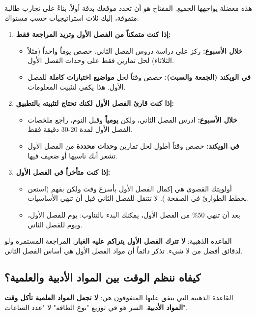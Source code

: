 \documentclass[12pt,a4paper]{book}
\begin{document}
	هذه معضلة يواجهها الجميع. المفتاح هو أن تحدد موقعك بدقة أولاً. بناءً على تجارب طالبة متفوقة، إليك ثلاث استراتيجيات حسب مستواك:
	
	\begin{enumerate}
		\item \textbf{إذا كنت متمكناً من الفصل الأول وتريد المراجعة فقط:}
		\begin{itemize}
			\item \textbf{خلال الأسبوع:} ركز على دراسة دروس الفصل الثاني. خصص يوماً واحداً (مثلاً الثلاثاء) لحل تمارين فقط على وحدات الفصل الأول.
			\item \textbf{في الويكند (الجمعة والسبت):} خصص وقتاً لحل \textbf{مواضيع اختبارات كاملة} للفصل الأول. هذا يكفي لتثبيت المعلومات.
		\end{itemize}
		\item \textbf{إذا كنت قارئ الفصل الأول لكنك تحتاج لتثبيته بالتطبيق:}
		\begin{itemize}
			\item \textbf{خلال الأسبوع:} ادرس الفصل الثاني، ولكن \textbf{يومياً} وقبل النوم، راجع ملخصات الفصل الأول لمدة 20-30 دقيقة فقط.
			\item \textbf{في الويكند:} خصص وقتاً أطول لحل تمارين \textbf{وحدات محددة} من الفصل الأول تشعر أنك ناسيها أو ضعيف فيها.
		\end{itemize}
		\item \textbf{إذا كنت متأخراً في الفصل الأول:}
		\begin{itemize}
			\item أولويتك القصوى هي إكمال الفصل الأول بأسرع وقت ولكن بفهم (استعن بخطط الطوارئ في الصفحة \pageref{sec:psy-late-start-success}). لا تنتقل للفصل الثاني قبل أن تنهي الأساسيات. 
			\item بعد أن تنهي 50\% من الفصل الأول، يمكنك البدء بالتناوب: يوم للفصل الأول، ويوم للفصل الثاني.
		\end{itemize}
	\end{enumerate}
	
	القاعدة الذهبية: \textbf{لا تترك الفصل الأول يتراكم عليه الغبار}. المراجعة المستمرة ولو لدقائق أفضل من لا شيء. تذكر دائماً أن مواد الفصل الأول هي أساس الفصل الثاني.
	
	
	\subsection*{كيفاه ننظم الوقت بين المواد الأدبية والعلمية؟}
	
	القاعدة الذهبية التي يتفق عليها المتفوقون هي: \textbf{لا تجعل المواد العلمية تأكل وقت المواد الأدبية}. السر هو في توزيع "نوع الطاقة" لا "عدد الساعات".
	
\end{document}
